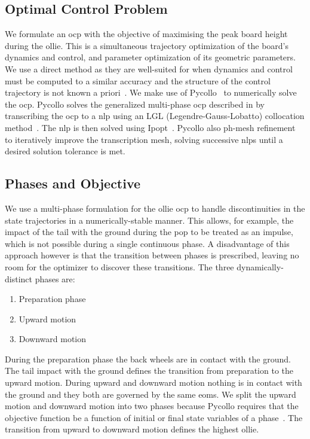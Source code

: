 \documentclass[default,iicol]{sn-jnl}
\begin{document}
\subsection{Optimal Control Problem}
We formulate an \gls{ocp} with the objective of maximising the peak board height during the ollie. This is a simultaneous trajectory optimization of the board's dynamics and control, and parameter optimization of its geometric parameters. We use a direct method as they are well-suited for when dynamics and control must be computed to a similar accuracy and the structure of the control trajectory is not known a priori~\cite{kelly_introduction_2017}. We make use of Pycollo~\cite{brockie_2021_predictive} to numerically solve the \gls{ocp}. Pycollo solves the generalized multi-phase \gls{ocp} described in \cite{betts_2010_practical} by transcribing the \gls{ocp} to a \gls{nlp} using an LGL (Legendre-Gauss-Lobatto) collocation method~\cite{betts_2016_using}. The \gls{nlp} is then solved using Ipopt~\cite{biegler_2009_large}. Pycollo also ph-mesh refinement~\cite{patterson_2015_ph} to iteratively improve the transcription mesh, solving successive \glspl{nlp} until a desired solution tolerance is met.

\subsection{Phases and Objective} \label{s_phases}

We use a multi-phase formulation for the ollie \gls{ocp} to handle discontinuities in the state trajectories in a numerically-stable manner. This allows, for example, the impact of the tail with the ground during the pop to be treated as an impulse, which is not possible during a single continuous phase. A disadvantage of this approach however is that the transition between phases is prescribed, leaving no room for the optimizer to discover these transitions. The three dynamically-distinct phases are:
\begin{enumerate} \label{n_phases}
  \item Preparation phase
  \item Upward motion
  \item Downward motion
\end{enumerate}

During the preparation phase the back wheels are in contact with the ground. The tail impact with the ground defines the transition from preparation to the upward motion. During upward and downward motion nothing is in contact with the ground and they both are governed by the same \glspl{eom}. We split the upward motion and downward motion into two phases because Pycollo requires that the objective function be a function of initial or final state variables of a phase~\cite{brockie_2021_predictive}. The transition from upward to downward motion defines the highest ollie.
\end{document}

